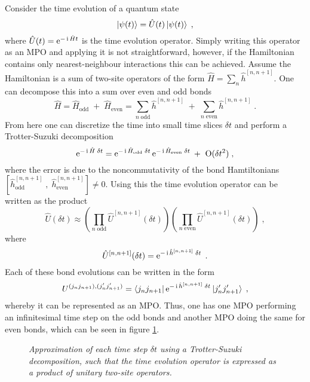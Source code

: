 Consider the time evolution of a quantum state
\begin{equation}
	\ket{\psi (t)} = \hat{U}(t) \ket{\psi (t)} \; ,
\end{equation}
where $\hat{U}(t) = \operatorname{e}^{ - \operatorname{i} \hat{H} t }$ is the time evolution operator. Simply writing this operator as an MPO and applying it is not straightforward, however, if the Hamiltonian contains only nearest-neighbour interactions this can be achieved.
Assume the Hamiltonian is a sum of two-site operators of the form $\hat{H} = \sum_{n} \hat{h}^{[n , n+1]}$. One can decompose this into a sum over even and odd bonds
\begin{equation}
	\hat{H} = \hat{H}_{\mathrm{odd}} \; + \; \hat{H}_{\mathrm{even}} = \sum_{n \; \mathrm{odd}} \hat{h}^{[n , n+1]} \; + \; \sum_{n \; \mathrm{even}} \hat{h}^{[n , n+1]} \; .
\end{equation}  
From here one can discretize the time into small time slices $\delta t$ and perform a Trotter-Suzuki decomposition \cite{Suzuki}
\begin{equation}
	\operatorname{e}^{- \operatorname{i} \hat{H} \; \delta t} = \operatorname{e}^{- \operatorname{i} \hat{H}_{\mathrm{odd}} \; \delta t } \operatorname{e}^{- \operatorname{i} \hat{H}_{\mathrm{even}} \; \delta t} \; + \; \;  \mathrm{O}(\delta t^2) \; ,
\end{equation}
where the error is due to the noncommutativity of the bond Hamtiltonians $[ \hat{h}_{\mathrm{odd}}^{[n , n+1]} \; , \; \hat{h}_{\mathrm{even}}^{[n , n+1]} ] \neq 0$. Using this the time evolution operator can be written as the product
\begin{equation}
	\hat{U}(\delta t) \approx \left( \prod_{n \; \mathrm{odd}} \hat{U}^{[n,n+1]} (\delta t) \right) \left( \prod_{n \; \mathrm{even}} \hat{U}^{[n,n+1]} (\delta t) \right) \; ,
\end{equation}
where
\begin{equation}
	\hat{U}^{[n,n+1]} (\delta t) = \operatorname{e}^{- \operatorname{i} \hat{h}^{[n , n+1]} \; \delta t } \; .
\end{equation}
Each of these bond evolutions can be written in the form
\begin{equation}
	 U^{(j_n j_{n+1}), (j_n ' j_{n+1} ')} =  \bra{j_n j_{n+1}} \operatorname{e}^{- \operatorname{i} \hat{h}^{[n , n+1]} \; \delta t } \ket{j_n ' j_{n+1} '} \; ,
\end{equation}
whereby it can be represented as an MPO. Thus, one has one MPO performing an infinitesimal time step on the odd bonds and another MPO doing the same for even bonds, which can be seen in figure \ref{fig:oddevenops}.
\begin{figure}[h!]
	\centering
	
	\caption{\textit{Approximation of each time step $\delta t$ using a Trotter-Suzuki decomposition, such that the time evolution operator is expressed as a product of unitary two-site operators.}}
	\label{fig:oddevenops}
\end{figure}

